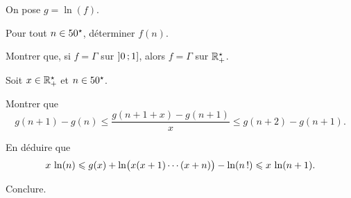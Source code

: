 \begin{exercice}
On pose $g = \ln(f)$.
\begin{questions}
\item Pour tout $n \in 50^\star$, déterminer $f(n)$.

\item Montrer que, si $f = \Gamma$ sur $\left]0\,;1\right]$, alors $f = \Gamma$ sur $\mathbb{R}^\star_+$.
\end{questions}

Soit $x \in \mathbb{R}^\star_+$ et $n \in 50^\star$.
\begin{questions}[resume]
\item Montrer que
\[
g(n + 1) - g(n) \leqslant \frac{g(n + 1 + x) - g(n + 1)}{x} \leqslant g(n + 2) - g(n + 1).
\]

\item En déduire que
\[
x \, \ln(n) \leqslant g(x) + \ln\mathopen{}\big(x (x + 1) \cdots (x + n)\big) - \ln(n\,!) \leqslant x \, \ln(n + 1).
\]

\item Conclure.
\end{questions}
\end{exercice}


